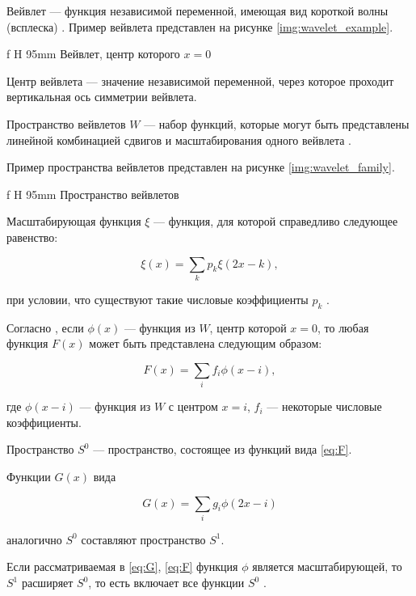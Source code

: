 Вейвлет --- функция независимой переменной, имеющая вид короткой волны (всплеска) \cite{Kryzhevich,Smolentsev,Malla}. Пример вейвлета представлен на рисунке \ref{img:wavelet_example}.

 {f} {H} {95mm}%
{Вейвлет, центр которого $x=0$}

Центр вейвлета --- значение независимой переменной, через которое проходит вертикальная ось симметрии вейвлета.

Пространство вейвлетов $W$ --- набор функций, которые могут быть представлены линейной комбинацией сдвигов и масштабирования одного вейвлета \cite{Novikov,Meyer}.

Пример пространства вейвлетов представлен на рисунке \ref{img:wavelet_family}.

 {f} {H} {95mm}%
{Пространство вейвлетов}

Масштабирующая функция $\xi$ --- функция, для которой справедливо следующее равенство:

\begin{equation}\label{eq:refine}
	\xi(x)=\sum_{k}p_k\xi(2x-k),
\end{equation}

при условии, что существуют такие числовые коэффициенты $p_k$ \cite{pixar,Novikov}.

Согласно \cite{pixar}, если $\phi(x)$ --- функция из $W$, центр которой $x=0$, то любая функция $F(x)$ может быть представлена следующим образом:

\begin{equation}\label{eq:F}
	F(x)=\sum_{i}f_i\phi(x-i),
\end{equation}

где $\phi(x-i)$ --- функция из $W$ с центром $x=i$, $f_i$ --- некоторые числовые коэффициенты.

Пространство $S^0$ --- пространство, состоящее из функций вида \ref{eq:F}.

Функции $G(x)$ вида

\begin{equation}\label{eq:G}
	G(x)=\sum_{i}g_i\phi(2x-i)
\end{equation}

аналогично $S^0$ составляют пространство $S^1$. \cite{pixar}

Если рассматриваемая в \ref{eq:G}, \ref{eq:F} функция $\phi$ является масштабирующей, то $S^1$ расширяет $S^0$, то есть включает все функции $S^0$ \cite{pixar,Novikov}.

